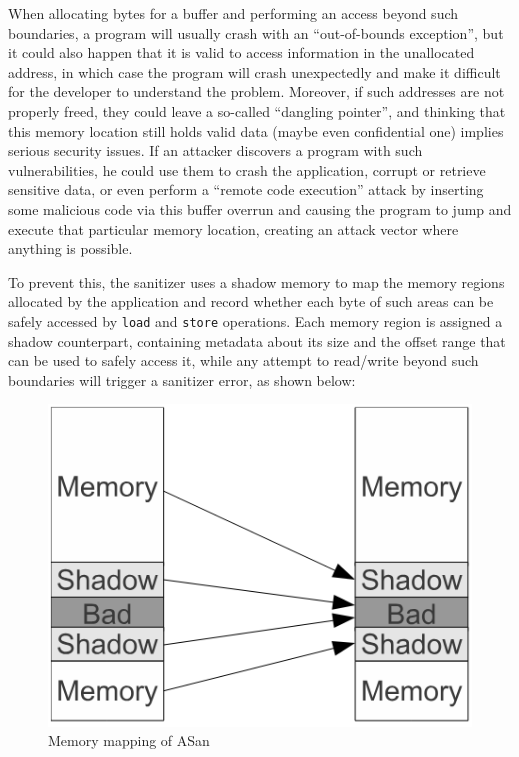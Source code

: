 When allocating bytes for a buffer and performing an access beyond such boundaries, a program will usually crash with an ``out-of-bounds exception'', but it could also happen that it is valid to access information in the unallocated address, in which case the program will crash unexpectedly and make it difficult for the developer to understand the problem. Moreover, if such addresses are not properly freed, they could leave a so-called ``dangling pointer'', and thinking that this memory location still holds valid data (maybe even confidential one) implies serious security issues.
If an attacker discovers a program with such vulnerabilities, he could use them to crash the application, corrupt or retrieve sensitive data, or even perform a ``remote code execution'' attack by inserting some malicious code via this buffer overrun and causing the program to jump and execute that particular memory location, creating an attack vector where anything is possible. 

To prevent this, the sanitizer uses a shadow memory to map the memory regions allocated by the application and record whether each byte of such areas can be safely accessed by \verb|load| and \verb|store| operations. Each memory region is assigned a shadow counterpart, containing metadata about its size and the offset range that can be used to safely access it, while any attempt to read/write beyond such boundaries will trigger a sanitizer error, as shown below:

\begin{figure}[h]
\centering
\includegraphics[scale=0.6]{foto/shadow_memory.png}
\caption{Memory mapping of ASan \cite{serebryany2012addresssanitizer}}
\label{fig:asan_shadow}
\end{figure}

